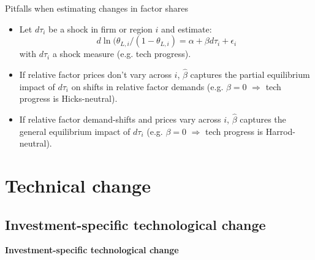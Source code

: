 \documentclass[notes=show]{beamer}
\begin{document}
\begin{frame}{Pitfalls when estimating changes in factor shares}
\begin{itemize}
\item Let $d \tau_{i}$ be a shock in firm or region $i$ and estimate: \medskip
\begin{equation*}
    d \ln(\theta_{L,i} / (1-\theta_{L,i}) = \alpha + \beta d \tau_{i} + \epsilon_{i} \tag{2}
\end{equation*}
with $d \tau_{i} $ a shock measure (e.g. tech progress). \medskip
\item If relative factor prices don't vary across $i$, $\hat{\beta} $ captures the partial equilibrium impact of $ d \tau_{i}$ on shifts in relative factor demands (e.g. $\beta= 0 $ $\Rightarrow $ tech progress is Hicks-neutral).
\medskip
\item If relative factor demand-shifts and prices vary across $i$, $\hat{\beta} $ captures the general equilibrium impact of $ d \tau_{i}$ (e.g. $\beta= 0 $ $\Rightarrow $ tech progress is Harrod-neutral).
\end{itemize}
\end{frame}

\section{Technical change}

\subsection*{Investment-specific technological change}

\begin{frame}
	\centering
	\textbf{Investment-specific technological change}
\end{frame}
\end{document}
